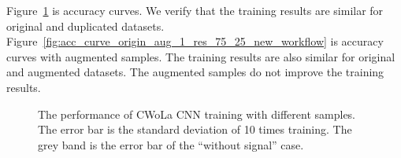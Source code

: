 \documentclass[12pt]{article}
\begin{document}
		Figure~\ref{fig:acc_curve_origin_copy_1_res_75_25_new_workflow} is accuracy curves. We verify that the training results are similar for original and duplicated datasets. Figure~\ref{fig:acc_curve_origin_aug_1_res_75_25_new_workflow} is accuracy curves with augmented samples. The training results are also similar for original and augmented datasets. The augmented samples do not improve the training results.
		\begin{figure}[htpb]
			\centering
			\caption{The performance of CWoLa CNN training with different samples. The error bar is the standard deviation of 10 times training. The grey band is the error bar of the ``without signal'' case.}
			\label{fig:acc_curve_origin_copy_1_res_75_25_new_workflow}
		\end{figure}
\end{document}
